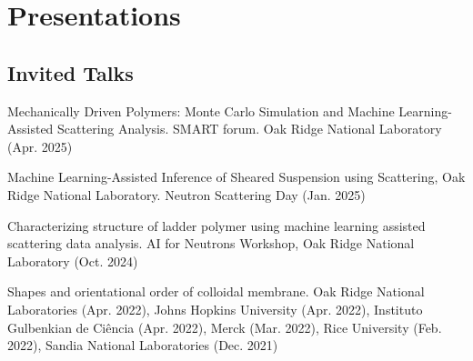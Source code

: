 \documentclass[11pt,letterpaper]{article}
\begin{document}
\section*{Presentations}

\subsection*{Invited Talks}
\begin{etaremune}
    \item Mechanically Driven Polymers: Monte Carlo Simulation and Machine Learning-Assisted Scattering Analysis. SMART forum. Oak Ridge National Laboratory (Apr. 2025)
    \item Machine Learning-Assisted Inference of Sheared Suspension using Scattering, Oak Ridge National Laboratory. Neutron Scattering Day (Jan. 2025)
    \item Characterizing structure of ladder polymer using machine learning assisted scattering data analysis. AI for Neutrons Workshop, Oak Ridge National Laboratory (Oct. 2024)
    \item Shapes and orientational order of colloidal membrane. Oak Ridge National Laboratories (Apr. 2022), Johns Hopkins University (Apr. 2022), Instituto Gulbenkian de Ciência (Apr. 2022), Merck (Mar. 2022), Rice University (Feb. 2022), Sandia National Laboratories (Dec. 2021)
\end{etaremune}
\end{document}
